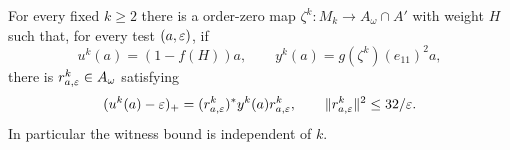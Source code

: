 \begin{proposition}\label{prop:rankgap}
For every fixed $k\ge2$ there is a \cpc order-zero map
$\zeta^k:M_k\to A_\omega\cap A'$ with weight $H$ such that, for every
test $(a,\varepsilon)$, if
\begin{equation}\label{cmp:u-y}
 u^k(a)=(1-f(H))a,
 \qquad y^k(a)=g(\zeta^k)(e_{11})^2a,
\end{equation}
there is $r_{a,\varepsilon}^k\in A_\omega$ satisfying
\begin{equation}\label{cmp:bounded-comparison}
 (u^k(a)-\varepsilon)_+
   =(r_{a,\varepsilon}^k)^*y^k(a)r_{a,\varepsilon}^k,
 \qquad \|r_{a,\varepsilon}^k\|^2\le32/\varepsilon.
\end{equation}
In particular the witness bound is independent of $k$.
\end{proposition}

